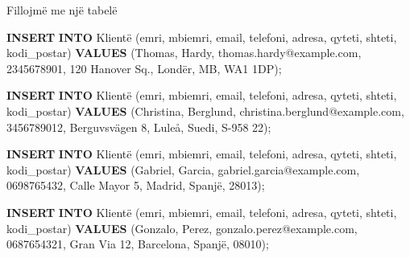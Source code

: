 \documentclass[
  ignorenonframetext,
]{beamer}
\newenvironment{Shaded}{\begin{snugshade}}{\end{snugshade}}
\newcommand{\KeywordTok}[1]{\textcolor[rgb]{0.13,0.29,0.53}{\textbf{#1}}}
\newcommand{\NormalTok}[1]{#1}
\newcommand{\StringTok}[1]{\textcolor[rgb]{0.31,0.60,0.02}{#1}}
\begin{document}
\begin{frame}[fragile]{Fillojmë me një tabelë}
\begin{Shaded}
\begin{Highlighting}[]
\KeywordTok{INSERT} \KeywordTok{INTO}\NormalTok{ Klientë (emri, mbiemri, email, telefoni, adresa, qyteti, shteti, kodi\_postar)}
\KeywordTok{VALUES}\NormalTok{ (}\StringTok{\textquotesingle{}Thomas\textquotesingle{}}\NormalTok{, }\StringTok{\textquotesingle{}Hardy\textquotesingle{}}\NormalTok{, }\StringTok{\textquotesingle{}thomas.hardy@example.com\textquotesingle{}}\NormalTok{, }\StringTok{\textquotesingle{}2345678901\textquotesingle{}}\NormalTok{, }\StringTok{\textquotesingle{}120 Hanover Sq.\textquotesingle{}}\NormalTok{, }\StringTok{\textquotesingle{}Londër\textquotesingle{}}\NormalTok{, }\StringTok{\textquotesingle{}MB\textquotesingle{}}\NormalTok{, }\StringTok{\textquotesingle{}WA1 1DP\textquotesingle{}}\NormalTok{);}

\KeywordTok{INSERT} \KeywordTok{INTO}\NormalTok{ Klientë (emri, mbiemri, email, telefoni, adresa, qyteti, shteti, kodi\_postar)}
\KeywordTok{VALUES}\NormalTok{ (}\StringTok{\textquotesingle{}Christina\textquotesingle{}}\NormalTok{, }\StringTok{\textquotesingle{}Berglund\textquotesingle{}}\NormalTok{, }\StringTok{\textquotesingle{}christina.berglund@example.com\textquotesingle{}}\NormalTok{, }\StringTok{\textquotesingle{}3456789012\textquotesingle{}}\NormalTok{, }\StringTok{\textquotesingle{}Berguvsvägen 8\textquotesingle{}}\NormalTok{, }\StringTok{\textquotesingle{}Luleå\textquotesingle{}}\NormalTok{, }\StringTok{\textquotesingle{}Suedi\textquotesingle{}}\NormalTok{, }\StringTok{\textquotesingle{}S{-}958 22\textquotesingle{}}\NormalTok{);}

\KeywordTok{INSERT} \KeywordTok{INTO}\NormalTok{ Klientë (emri, mbiemri, email, telefoni, adresa, qyteti, shteti, kodi\_postar)}
\KeywordTok{VALUES}\NormalTok{ (}\StringTok{\textquotesingle{}Gabriel\textquotesingle{}}\NormalTok{, }\StringTok{\textquotesingle{}Garcia\textquotesingle{}}\NormalTok{, }\StringTok{\textquotesingle{}gabriel.garcia@example.com\textquotesingle{}}\NormalTok{, }\StringTok{\textquotesingle{}0698765432\textquotesingle{}}\NormalTok{, }\StringTok{\textquotesingle{}Calle Mayor 5\textquotesingle{}}\NormalTok{, }\StringTok{\textquotesingle{}Madrid\textquotesingle{}}\NormalTok{, }\StringTok{\textquotesingle{}Spanjë\textquotesingle{}}\NormalTok{, }\StringTok{\textquotesingle{}28013\textquotesingle{}}\NormalTok{);}

\KeywordTok{INSERT} \KeywordTok{INTO}\NormalTok{ Klientë (emri, mbiemri, email, telefoni, adresa, qyteti, shteti, kodi\_postar)}
\KeywordTok{VALUES}\NormalTok{ (}\StringTok{\textquotesingle{}Gonzalo\textquotesingle{}}\NormalTok{, }\StringTok{\textquotesingle{}Perez\textquotesingle{}}\NormalTok{, }\StringTok{\textquotesingle{}gonzalo.perez@example.com\textquotesingle{}}\NormalTok{, }\StringTok{\textquotesingle{}0687654321\textquotesingle{}}\NormalTok{, }\StringTok{\textquotesingle{}Gran Via 12\textquotesingle{}}\NormalTok{, }\StringTok{\textquotesingle{}Barcelona\textquotesingle{}}\NormalTok{, }\StringTok{\textquotesingle{}Spanjë\textquotesingle{}}\NormalTok{, }\StringTok{\textquotesingle{}08010\textquotesingle{}}\NormalTok{);}


\end{Highlighting}
\end{Shaded}
\end{frame}
\end{document}
